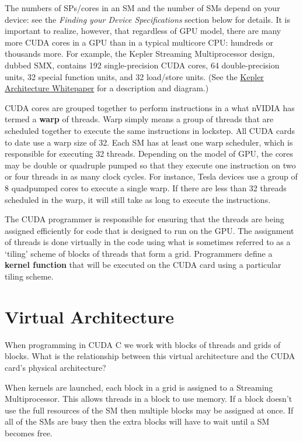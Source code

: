 \documentclass[letterpaper,10pt,openany,oneside]{sphinxmanual}
\begin{document}
The numbers of SPs/cores in an SM and the number of SMs depend on your device: see the \emph{Finding your
Device Specifications} section below for details. It is important to realize, however, that
regardless of GPU model, there are many more CUDA cores in a GPU than in a typical multicore CPU:
hundreds or thousands more. For example, the Kepler Streaming Multiprocessor design, dubbed SMX, contains 192
single-precision CUDA cores, 64 double-precision units, 32 special function units, and 32 load/store units.
(See the \href{http://www.nvidia.com/content/PDF/kepler/NVIDIA-Kepler-GK110-Architecture-Whitepaper.pdf}{Kepler Architecture Whitepaper}
for a description and diagram.)

CUDA cores are grouped together to perform instructions in
a what nVIDIA has termed a \textbf{warp} of threads. Warp simply means a group of threads
that are scheduled together to execute the same instructions in lockstep.
All CUDA cards to date use a warp size of 32.
Each SM has at least one warp scheduler, which is responsible for executing 32 threads.
Depending on the model of GPU, the cores may be
double or quadruple pumped so that they execute one instruction
on two or four threads in as many clock cycles.
For instance, Tesla devices use a group of 8 quadpumped cores
to execute a single warp. If there are less than 32 threads scheduled in
the warp, it will still take as long to execute the instructions.

The CUDA programmer is responsible for ensuring that the threads are being assigned
efficiently for code that is designed to run on the GPU.  The assignment of threads
is done virtually in the code using what is sometimes referred to as a `tiling' scheme
of blocks of threads that form a grid.  Programmers define a \textbf{kernel function}
that will be executed on the CUDA card using a particular tiling scheme.


\section{Virtual Architecture}
\label{0-Architecture/Architecture:virtual-architecture}
When programming in CUDA C we work with blocks of threads and
grids of blocks. What is the relationship between this virtual
architecture and the CUDA card's physical architecture?

When kernels are launched, each block in a grid is assigned to a
Streaming Multiprocessor. This allows threads in a block to use
 memory. If a block doesn't use the full resources
of the SM then multiple blocks may be assigned at once. If all of
the SMs are busy then the extra blocks will have to wait until a
SM becomes free.
\end{document}
